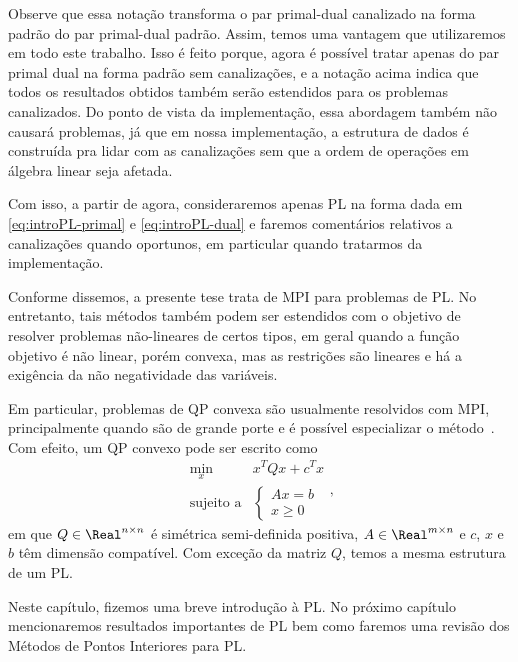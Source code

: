 Observe que essa notação transforma o par primal-dual canalizado na forma padrão do par primal-dual padrão. Assim, temos uma vantagem que utilizaremos em todo este trabalho. Isso é feito porque, agora é possível tratar apenas do par primal dual na forma padrão sem canalizações, e a notação acima indica que todos os resultados obtidos também serão estendidos para os problemas canalizados. Do ponto de vista da implementação, essa abordagem também não causará problemas, já que em nossa implementação, a estrutura de dados é  construída pra lidar com as canalizações sem que a ordem de operações em álgebra linear seja afetada.

Com isso, a partir de agora, consideraremos apenas \ac{PL} na forma dada em \eqref{eq:introPL-primal} e \eqref{eq:introPL-dual} e faremos comentários relativos a canalizações quando oportunos, em particular quando tratarmos da implementação.


Conforme dissemos, a presente tese trata de \ac{MPI} para problemas de \ac{PL}. No entretanto, tais
métodos também podem ser estendidos com o objetivo de resolver problemas não-lineares
de certos tipos, em geral quando a função objetivo é não linear, porém convexa, mas as restrições são lineares e há a exigência da não negatividade das variáveis. 

Em particular, problemas de  \ac{QP} convexa
são usualmente resolvidos com \ac{MPI}, principalmente
quando são de grande porte e é possível especializar o método~\cite{Gondzio:2010bh}. Com efeito, um \ac{QP} convexo pode ser  escrito como
\begin{equation*}
	\begin{array}{lc}
\displaystyle \min_{x} & x^TQx + c^Tx \\
\text{sujeito a} &\begin{cases} Ax = b \\
				 x \geq 0	
				 \end{cases}
\end{array},
\label{eq:QP}
\end{equation*}
em que $Q\in\Real^{n\times n}$ é simétrica semi-definida positiva, $A\in \Real^{m\times
n}$ e $c$, $x$ e $b$ têm dimensão compatível. Com exceção da matriz $Q$, temos a
mesma estrutura de um \ac{PL}.


Neste capítulo, fizemos uma breve introdução à \acf{PL}. No próximo capítulo mencionaremos resultados importantes de PL bem como faremos uma revisão dos Métodos de Pontos Interiores  para \ac{PL}.